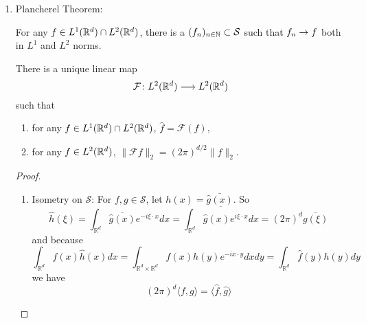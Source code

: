 \begin{enumerate}[label=\arabic*.]
	\item Plancherel Theorem: 
	\begin{lem}
		For any $f \in L^1(\mathbb{R}^d) \cap L^2(\mathbb{R}^d)$, there is a $(f_n)_{n \in \mathbb{N}} \subset \mathcal{S}$ such that $f_n \rightarrow f$ both in $L^1$ and $L^2$ norms.
	\end{lem}

	\begin{thm}
		There is a unique linear map
		\begin{equation*}
			\mathcal{F} \colon L^2(\mathbb{R}^d) \longrightarrow L^2(\mathbb{R}^d)
		\end{equation*}
		such that
		\begin{enumerate}[label=(\arabic{*})]
			\item for any $f \in L^1(\mathbb{R}^d) \cap L^2(\mathbb{R}^d)$, $\widehat{f} = \mathcal{F}(f)$,
			\item for any $f \in L^2(\mathbb{R}^d)$, $\|\mathcal{F} f\|_2=(2 \pi)^{d / 2}\|f\|_2$.
		\end{enumerate}
	\end{thm}
	\begin{proof}
		\begin{enumerate}[label=\Roman*.]
			\item Isometry on $\mathcal{S}$: For $f, g \in \mathcal{S}$, let $h(x) = \bar{\widehat{g}(x)}$. So
			\begin{equation*}
				\widehat{h}(\xi) =\int_{\mathbb{R}^d} \overline{\widehat{g}(x)} e^{-i \xi \cdot x} d x=\overline{\int_{\mathbb{R}^d} \widehat{g}(x) e^{i \xi \cdot x} d x}=(2 \pi)^d \overline{g(\xi)}
			\end{equation*}
			and because
			\begin{equation*}
				\int_{\mathbb{R}^d} f(x) \widehat{h}(x) d x=\int_{\mathbb{R}^d \times \mathbb{R}^d} f(x) h(y) e^{-i x \cdot y} d x d y=\int_{\mathbb{R}^d} \widehat{f}(y) h(y) d y
			\end{equation*}
			we have
			\begin{equation*}
				(2 \pi)^d\langle f, g\rangle=\langle\widehat{f}, \widehat{g}\rangle
			\end{equation*}


\end{enumerate}
\end{proof}
\end{enumerate}
